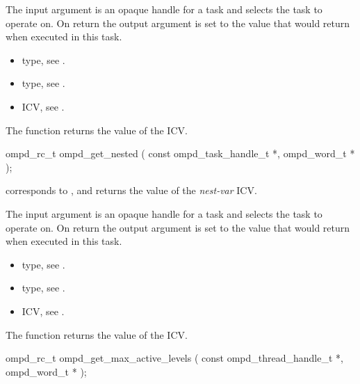 \argdesc
The input argument  is an opaque handle for a task and selects the task to operate on.
On return the output argument  is set to the value that  would return when
executed in this task.

\crossreferences
\begin{itemize}
	\item {} type, see .
	\item {} type, see .
	\item {} ICV, see .
\end{itemize}


\label{ompd:ompd_get_nested}
\summary
The  function returns the value of the  ICV.

\format
\begin{cspecific}
\begin{ompSyntax}
ompd_rc_t ompd_get_nested (
  const ompd_task_handle_t *,
  ompd_word_t *
);
\end{ompSyntax}
\end{cspecific}

\descr
{} corresponds to ,
and returns the value of the \emph{nest-var} ICV.

\argdesc
The input argument  is an opaque handle for a task and selects the task to operate on.
On return the output argument  is set to the value that  would return when
executed in this task.

\crossreferences
\begin{itemize}
	\item {} type, see .
	\item {} type, see .
	\item {} ICV, see .
\end{itemize}


\label{ompd:ompd_get_max_active_levels}
\summary
The  function returns the value of the  ICV.

\format
\begin{cspecific}
\begin{ompSyntax}
ompd_rc_t ompd_get_max_active_levels (
  const ompd_thread_handle_t *,
  ompd_word_t *
);
\end{ompSyntax}
\end{cspecific}

